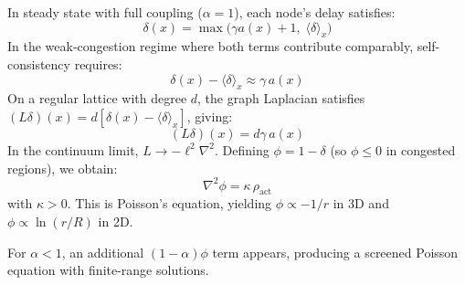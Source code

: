 \documentclass[aps, pra, reprint, superscriptaddress, nofootinbib, singlespacing]{revtex4-2}
\begin{document}
In steady state with full coupling ($\alpha = 1$), each node's delay satisfies:
\begin{equation}
    \delta(x) = \max\bigl(\gamma a(x) + 1,\; \langle\delta\rangle_x\bigr)
\end{equation}
In the weak-congestion regime where both terms contribute comparably, self-consistency requires:
\begin{equation}
    \delta(x) - \langle\delta\rangle_x \approx \gamma\, a(x)
\end{equation}
On a regular lattice with degree $d$, the graph Laplacian satisfies $(L\delta)(x) = d[\delta(x) - \langle\delta\rangle_x]$, giving:
\begin{equation}
    (L\delta)(x) = d\gamma\, a(x)
\end{equation}
In the continuum limit, $L \to -\ell^2\nabla^2$. Defining $\phi = 1 - \delta$ (so $\phi \leq 0$ in congested regions), we obtain:
\begin{equation}
    \nabla^2\phi = \kappa\,\rho_{\mathrm{act}}
\end{equation}
with $\kappa > 0$. This is Poisson's equation, yielding $\phi \propto -1/r$ in 3D and $\phi \propto \ln(r/R)$ in 2D.

For $\alpha < 1$, an additional $(1-\alpha)\phi$ term appears, producing a screened Poisson equation with finite-range solutions.
\end{document}
